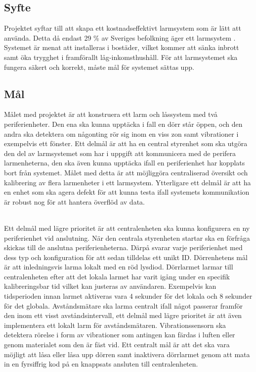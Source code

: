 \documentclass{article}
\begin{document}

\subsection{Syfte}
Projektet syftar till att skapa ett kostnadseffektivt larmsystem som är lätt att använda.
Detta då endast 29 \% av Sveriges befolkning äger ett larmsystem \cite{SSF}.
Systemet är menat att installeras i bostäder, vilket kommer att sänka inbrott samt öka trygghet i framförallt låg-inkomsthushåll.
För att larmsystemet ska fungera säkert och korrekt, måste mål för systemet sättas upp.

\subsection{Mål}
Målet med projektet är att konstruera ett larm och låssystem med två periferienheter.
Den ena ska kunna upptäcka i fall en dörr står öppen, och den andra ska detektera om någonting rör sig inom en viss zon samt vibrationer i exempelvis ett fönster. 
Ett delmål är att ha en central styrenhet som ska utgöra den del av larmsystemet som har i uppgift att kommunicera med de perifera larmenheterna, den ska även kunna upptäcka ifall en periferienhet har kopplats bort från systemet.
Målet med detta är att möjliggöra centraliserad översikt och kalibrering av flera larmenheter i ett larmsystem.
Ytterligare ett delmål är att ha en enhet som ska agera defekt för att kunna testa ifall systemets kommunikation är robust nog för att hantera överflöd av data.

\noindent
\\
Ett delmål med lägre prioritet är att centralenheten ska kunna konfigurera en ny periferienhet vid anslutning. När den centrala styrenheten startar ska en förfråga skickas till de anslutna periferienheterna.
Därpå svarar varje periferienhet med dess typ och konfiguration för att sedan tilldelas ett unikt ID.
Dörrenhetens mål är att inledningsvis larma lokalt med en röd lysdiod. 
Dörrlarmet larmar till centralenheten efter att det lokala larmet har varit igång under en specifik kalibreringsbar tid vilket kan justeras av användaren. Exempelvis kan tidsperioden innan larmet aktiveras vara 4 sekunder för det lokala och 8 sekunder för det globala.
Avståndsmätare ska larma centralt ifall något passerar framför den inom ett visst avståndsintervall, ett delmål med lägre prioritet är att även implementera ett lokalt larm för avståndsmätaren.
Vibrationssensorn ska detektera rörelse i form av vibrationer som antingen kan färdas i luften eller genom materialet som den är fäst vid.
Ett centralt mål är att det ska vara möjligt att låsa eller låsa upp dörren samt inaktivera dörrlarmet genom att mata in en fyrsiffrig kod på en knappsats ansluten till centralenheten.
\end{document}
